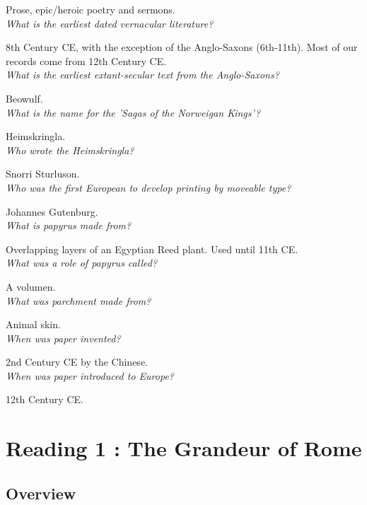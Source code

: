 \documentclass[12pt]{article}
\begin{document}
Prose, epic/heroic poetry and sermons.\\

\textit{What is the earliest dated vernacular literature?}

8th Century CE, with the exception of the Anglo-Saxons (6th-11th). Most of our records come from 12th Century CE.\\

\textit{What is the earliest extant-secular text from the Anglo-Saxons?}

Beowulf.\\

\textit{What is the name for the 'Sagas of the Norweigan Kings'?}

Heimskringla.\\

\textit{Who wrote the Heimskringla?}

Snorri Sturluson.\\

\textit{Who was the first European to develop printing by moveable type?}

Johannes Gutenburg.\\

\textit{What is papyrus made from?}

Overlapping layers of an Egyptian Reed plant. Used until 11th CE. \\

\textit{What was a role of papyrus called?}

A volumen.\\

\textit{What was parchment made from?}

Animal skin.\\

\textit{When was paper invented?}

2nd Century CE by the Chinese.\\

\textit{When was paper introduced to Europe?}

12th Century CE.\\



\section*{Reading 1 : The Grandeur of Rome}

\subsection*{Overview}
\end{document}
